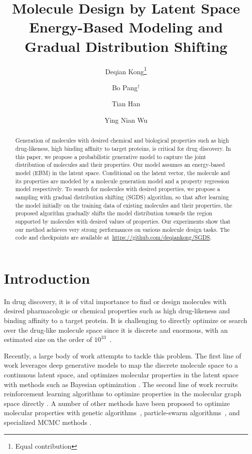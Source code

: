\documentclass[accepted]{uai2023} %
\title{Molecule Design by Latent Space Energy-Based Modeling and Gradual Distribution Shifting}
\author[1]{Deqian Kong\thanks{Equal contribution}}
\author[2]{Bo Pang$^\dagger$}
\author[3]{Tian Han}
\author[1]{Ying Nian Wu}
\affil[1]{%
    Department of Statistics\\
    University of California, Los Angeles
}
\affil[2]{%
    Salesforce Research
}
\affil[3]{%
    Department of Computer Science\\ 
    Stevens Institute of Technology
  }
\begin{document}
\maketitle

\begin{abstract}
  Generation of molecules with desired chemical and biological properties such as high drug-likeness, high binding affinity to target proteins, is critical for drug discovery. In this paper, we propose a probabilistic generative model to capture the joint distribution of molecules and their properties. Our model assumes an energy-based model (EBM) in the latent space. Conditional on the latent vector, the molecule and its properties are modeled by a molecule generation model and a property regression model respectively.  To search for molecules with desired properties,  we propose a sampling with gradual distribution shifting (SGDS) algorithm, so that after learning the model initially on the training data of existing molecules and their properties, the proposed algorithm gradually shifts the model distribution towards the region supported by molecules with desired values of properties. Our experiments show that our method achieves very strong performances on various molecule design tasks. The code and checkpoints are available at~\url{https://github.com/deqiankong/SGDS}. 
\end{abstract}


\section{Introduction}

In drug discovery, it is of vital importance to find or design molecules with desired pharmacologic or chemical properties such as high drug-likeness and binding affinity to a target protein. It is challenging to directly optimize or search over the drug-like molecule space since it is discrete and enormous, with an estimated size on the order of $10^{33}$~\citep{polishchuk2013estimation}. 

Recently, a large body of work attempts to tackle this problem. The first line of work leverages deep generative models to map the discrete molecule space to a continuous latent space, and optimizes molecular properties in the latent space with methods such as Bayesian optimization \citep{gomez2018automatic, kusner2017grammar, jin2018junction}. The second line of work recruits reinforcement learning algorithms to optimize properties in the molecular graph space directly \citep{you2018graph, de2018molgan, zhou2019optimization, shi2020graphaf, luo2021graphdf}. A number of other methods have been proposed to optimize molecular properties with genetic algorithms~\citep{nigam2020augmenting}, particle-swarm algorithms~\citep{winter2019efficient}, and specialized MCMC methods \citep{xie2021mars}. 
\end{document}
